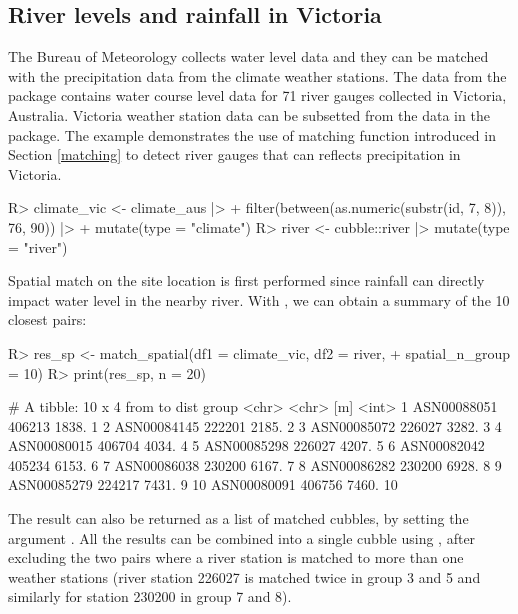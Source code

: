 \documentclass[
  shortnames]{jss}
\begin{document}
\hypertarget{river-levels-and-rainfall-in-victoria}{%
\subsection{River levels and rainfall in Victoria}\label{river-levels-and-rainfall-in-victoria}}

The Bureau of Meteorology collects water level data and they can be matched with the precipitation data from the climate weather stations. The data  from the  package contains water course level data for 71 river gauges collected in Victoria, Australia. Victoria weather station data can be subsetted from the  data in the  package. The example demonstrates the use of matching function introduced in Section \ref{matching} to detect river gauges that can reflects precipitation in Victoria.

\begin{CodeChunk}
\begin{CodeInput}
R> climate_vic <- climate_aus |>
+   filter(between(as.numeric(substr(id, 7, 8)), 76, 90)) |>
+   mutate(type = "climate")
R> river <- cubble::river |> mutate(type = "river") 
\end{CodeInput}
\end{CodeChunk}

Spatial match on the site location is first performed since rainfall can directly impact water level in the nearby river. With , we can obtain a summary of the 10 closest pairs:

\begin{CodeChunk}
\begin{CodeInput}
R> res_sp <- match_spatial(df1 = climate_vic, df2 = river, 
+                         spatial_n_group = 10)
R> print(res_sp, n = 20)
\end{CodeInput}
\begin{CodeOutput}
# A tibble: 10 x 4
   from        to      dist group
   <chr>       <chr>    [m] <int>
 1 ASN00088051 406213 1838.     1
 2 ASN00084145 222201 2185.     2
 3 ASN00085072 226027 3282.     3
 4 ASN00080015 406704 4034.     4
 5 ASN00085298 226027 4207.     5
 6 ASN00082042 405234 6153.     6
 7 ASN00086038 230200 6167.     7
 8 ASN00086282 230200 6928.     8
 9 ASN00085279 224217 7431.     9
10 ASN00080091 406756 7460.    10
\end{CodeOutput}
\end{CodeChunk}

The result can also be returned as a list of matched cubbles, by setting the argument . All the results can be combined into a single cubble using , after excluding the two pairs where a river station is matched to more than one weather stations (river station 226027 is matched twice in group 3 and 5 and similarly for station 230200 in group 7 and 8).
\end{document}
